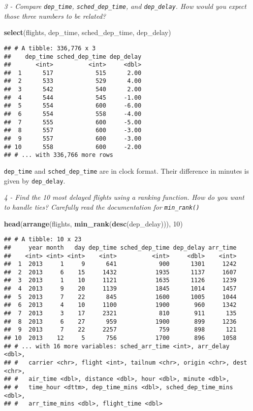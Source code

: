 \documentclass[]{article}
\newenvironment{Shaded}{\begin{snugshade}}{\end{snugshade}}
\newcommand{\KeywordTok}[1]{\textcolor[rgb]{0.13,0.29,0.53}{\textbf{#1}}}
\newcommand{\DecValTok}[1]{\textcolor[rgb]{0.00,0.00,0.81}{#1}}
\newcommand{\NormalTok}[1]{#1}
\theoremstyle{definition}
\theoremstyle{definition}
\theoremstyle{definition}
\theoremstyle{remark}
\begin{document}
\emph{3 - Compare \texttt{dep\_time}, \texttt{sched\_dep\_time}, and
\texttt{dep\_delay}. How would you expect those three numbers to be
related?}

\begin{Shaded}
\begin{Highlighting}[]
\KeywordTok{select}\NormalTok{(flights, dep_time, sched_dep_time, dep_delay)}
\end{Highlighting}
\end{Shaded}

\begin{verbatim}
## # A tibble: 336,776 x 3
##    dep_time sched_dep_time dep_delay
##       <int>          <int>     <dbl>
##  1      517            515      2.00
##  2      533            529      4.00
##  3      542            540      2.00
##  4      544            545     -1.00
##  5      554            600     -6.00
##  6      554            558     -4.00
##  7      555            600     -5.00
##  8      557            600     -3.00
##  9      557            600     -3.00
## 10      558            600     -2.00
## # ... with 336,766 more rows
\end{verbatim}

\texttt{dep\_time} and \texttt{sched\_dep\_time} are in clock format.
Their difference in minutes is given by \texttt{dep\_delay}.

\emph{4 - Find the 10 most delayed flights using a ranking function. How
do you want to handle ties? Carefully read the documentation for
\texttt{min\_rank()}}

\begin{Shaded}
\begin{Highlighting}[]
\KeywordTok{head}\NormalTok{(}\KeywordTok{arrange}\NormalTok{(flights, }\KeywordTok{min_rank}\NormalTok{(}\KeywordTok{desc}\NormalTok{(dep_delay))), }\DecValTok{10}\NormalTok{)}
\end{Highlighting}
\end{Shaded}

\begin{verbatim}
## # A tibble: 10 x 23
##     year month   day dep_time sched_dep_time dep_delay arr_time
##    <int> <int> <int>    <int>          <int>     <dbl>    <int>
##  1  2013     1     9      641            900      1301     1242
##  2  2013     6    15     1432           1935      1137     1607
##  3  2013     1    10     1121           1635      1126     1239
##  4  2013     9    20     1139           1845      1014     1457
##  5  2013     7    22      845           1600      1005     1044
##  6  2013     4    10     1100           1900       960     1342
##  7  2013     3    17     2321            810       911      135
##  8  2013     6    27      959           1900       899     1236
##  9  2013     7    22     2257            759       898      121
## 10  2013    12     5      756           1700       896     1058
## # ... with 16 more variables: sched_arr_time <int>, arr_delay <dbl>,
## #   carrier <chr>, flight <int>, tailnum <chr>, origin <chr>, dest <chr>,
## #   air_time <dbl>, distance <dbl>, hour <dbl>, minute <dbl>,
## #   time_hour <dttm>, dep_time_mins <dbl>, sched_dep_time_mins <dbl>,
## #   arr_time_mins <dbl>, flight_time <dbl>
\end{verbatim}
\end{document}
